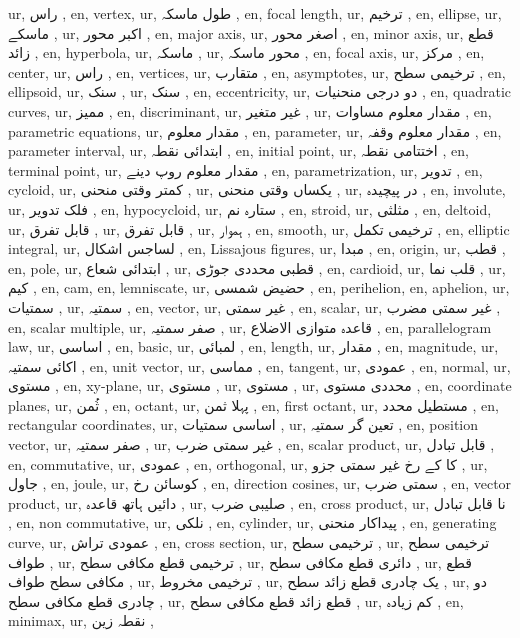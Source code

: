 ur, راس ,
en, vertex,
ur, طول ماسکہ ,
en, focal length,
ur, ترخیم ,
en, ellipse,
ur, ماسکے ,
ur, اکبر محور ,
en, major axis,
ur, اصغر محور ,
en, minor axis,
ur, قطع زائد ,
en, hyperbola,
ur, ماسکہ ,
ur, محور ماسکہ ,
en, focal axis,
ur, مرکز ,
en, center,
ur, راس ,
en, vertices,
ur, متقارب ,
en, asymptotes,
ur, ترخیمی سطح ,
en, ellipsoid,
ur, سنک ,
ur, سنک ,
en, eccentricity,
ur, دو درجی منحنیات ,
en, quadratic curves,
ur, ممیز ,
en, discriminant,
ur, غیر متغیر ,
ur, مقدار معلوم مساوات ,
en, parametric equations,
ur, مقدار معلوم ,
en, parameter,
ur, مقدار معلوم وقفہ ,
en, parameter interval,
ur, ابتدائی نقطہ ,
en, initial point,
ur, اختتامی نقطہ ,
en, terminal point,
ur, مقدار معلوم روپ دینے ,
en, parametrization,
ur, تدویر ,
en, cycloid,
ur, کمتر وقتی منحنی ,
ur, یکساں وقتی منحنی ,
ur, در پیچیدہ ,
en, involute,
ur, فلک تدویر ,
en, hypocycloid,
ur, ستارہ نم ,
en, stroid,
ur, مثلثی ,
en, deltoid,
ur, قابل تفرق ,
ur, قابل تفرق ,
ur, ہموار ,
en, smooth,
ur, ترخیمی تکمل ,
en, elliptic integral,
ur, لساجس اشکال ,
en, Lissajous figures,
ur, مبدا ,
en, origin,
ur, قطب ,
en, pole,
ur, ابتدائی شعاع ,
ur, قطبی محددی جوڑی ,
en, cardioid,
ur, قلب نما ,
ur, کیم ,
en, cam,
en, lemniscate,
ur, حضیض شمسی ,
en, perihelion,
en, aphelion,
ur, سمتیات ,
ur, سمتیہ ,
en, vector,
ur, غیر سمتی ,
en, scalar,
ur, غیر سمتی مضرب ,
en, scalar multiple,
ur, صفر سمتیہ ,
ur, قاعدہ متوازی الاضلاع ,
en, parallelogram law,
ur, اساسی ,
en, basic,
ur, لمبائی ,
en, length,
ur, مقدار ,
en, magnitude,
ur, اکائی سمتیہ ,
en, unit vector,
ur, مماسی ,
en, tangent,
ur, عمودی ,
en, normal,
ur, مستوی  ,
en, xy-plane,
ur, مستوی  ,
ur, مستوی  ,
ur, محددی مستوی ,
en, coordinate planes,
ur, ثُمن ,
en, octant,
ur, پہلا ثمن ,
en, first octant,
ur, مستطیل محدد ,
en, rectangular coordinates,
ur, اساسی سمتیات ,
ur, تعین گر سمتیہ ,
en, position vector,
ur, صفر سمتیہ ,
ur, غیر سمتی ضرب ,
en, scalar product,
ur, قابل تبادل ,
en, commutative,
ur, عمودی ,
en, orthogonal,
ur,  کا  کے رخ غیر سمتی جزو ,
ur, جاول ,
en, joule,
ur, کوسائن رخ ,
en, direction cosines,
ur, سمتی ضرب ,
en, vector product,
ur, دائیں ہاتھ قاعدہ ,
ur, صلیبی ضرب ,
en, cross product,
ur, نا قابل تبادل ,
en, non commutative,
ur, نلکی ,
en, cylinder,
ur, پیداکار منحنی ,
en, generating curve,
ur, عمودی تراش ,
en, cross section,
ur,  ترخیمی سطح ,
ur,  ترخیمی سطح طواف ,
ur, ترخیمی قطع مکافی سطح ,
ur, دائری قطع مکافی سطح  ,
ur, قطع مکافی سطح طواف ,
ur, ترخیمی مخروط ,
ur, یک چادری قطع زائد سطح ,
ur, دو چادری قطع مکافی سطح  ,
ur, قطع زائد قطع مکافی سطح ,
ur, کم زیادہ ,
en, minimax,
ur,  نقطہ زین ,
